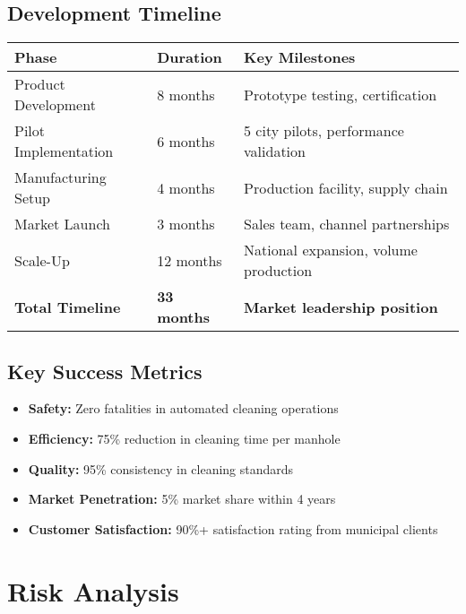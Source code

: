 \documentclass[11pt,a4paper]{article}
\begin{document}
\subsection{Development Timeline}
\begin{center}
\begin{tabular}{lll}
\toprule
\textbf{Phase} & \textbf{Duration} & \textbf{Key Milestones} \\
\midrule
Product Development & 8 months & Prototype testing, certification \\
Pilot Implementation & 6 months & 5 city pilots, performance validation \\
Manufacturing Setup & 4 months & Production facility, supply chain \\
Market Launch & 3 months & Sales team, channel partnerships \\
Scale-Up & 12 months & National expansion, volume production \\
\midrule
\textbf{Total Timeline} & \textbf{33 months} & \textbf{Market leadership position} \\
\bottomrule
\end{tabular}
\end{center}

\subsection{Key Success Metrics}
\begin{itemize}[leftmargin=2em]
    \item \textbf{Safety:} Zero fatalities in automated cleaning operations
    \item \textbf{Efficiency:} 75\% reduction in cleaning time per manhole
    \item \textbf{Quality:} 95\% consistency in cleaning standards
    \item \textbf{Market Penetration:} 5\% market share within 4 years
    \item \textbf{Customer Satisfaction:} 90\%+ satisfaction rating from municipal clients
\end{itemize}

\section{Risk Analysis}
\end{document}
